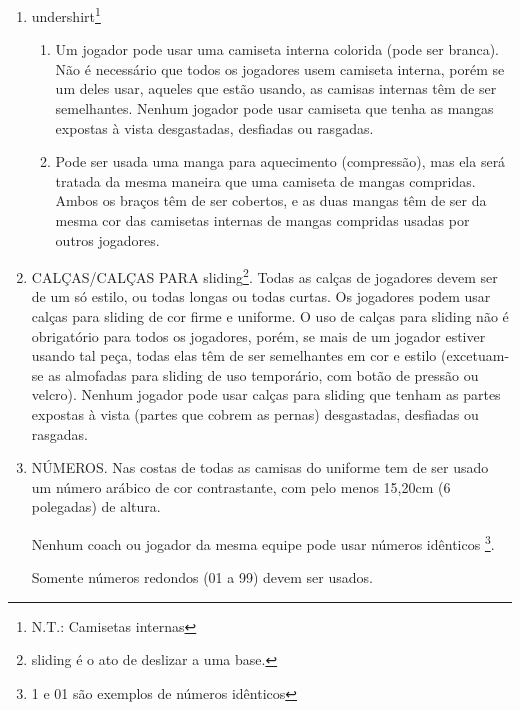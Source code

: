 \begin{multicols}{2}
\begin{enumerate}[label=\alph*)]
\begin{enumerate}[label=\roman* -]
			\item Se um jogador da defensiva usar um capacete aprovado de cor similar \`a do bon\'e do uniforme da equipe, n\~ao ser\'a exigido que ele use um bon\'e. 
		\end{enumerate}
		\item \gls{undershirt}\footnote{N.T.: Camisetas internas} 
		\begin{enumerate}[label=\roman* -]
			\item Um jogador pode usar uma camiseta interna colorida (pode ser branca). N\~ao \'e necess\'ario que todos os jogadores usem camiseta interna, por\'em se um deles usar, aqueles que est\~ao usando, as camisas internas t\^em de ser semelhantes. Nenhum jogador pode usar camiseta que tenha as mangas expostas \`a vista desgastadas, desfiadas ou rasgadas. 
			\item Pode ser usada uma manga para aquecimento (compress\~ao), mas ela ser\'a tratada da mesma maneira que uma camiseta de mangas compridas. Ambos os bra\c{c}os t\^em de ser cobertos, e as duas mangas t\^em de ser da mesma cor das camisetas internas de mangas compridas usadas por outros jogadores. 
		\end{enumerate}
		\item  CAL\c{C}AS/CAL\c{C}AS PARA \gls{sliding}\footnote{\gls{sliding} \'e o ato de deslizar a uma base.}. Todas as cal\c{c}as de jogadores devem ser de um s\'o estilo, ou todas longas ou todas curtas. Os jogadores podem usar cal\c{c}as para \gls{sliding} de cor firme e uniforme. O uso de cal\c{c}as para \gls{sliding} n\~ao \'e obrigat\'orio para todos os jogadores, por\'em, se mais de um jogador estiver usando tal pe\c{c}a, todas elas t\^em de ser semelhantes em cor e estilo (excetuam-se as almofadas para \gls{sliding} de uso tempor\'ario, com bot\~ao de press\~ao ou velcro). Nenhum jogador pode usar cal\c{c}as para \gls{sliding} que tenham as partes expostas \`a vista (partes que cobrem as pernas) desgastadas, desfiadas ou rasgadas. 
		
		\item  NÚMEROS. Nas costas de todas as camisas do uniforme tem de ser usado um n\'umero ar\'abico de cor contrastante, com pelo menos 15,20cm (6 polegadas) de altura. 
		
		Nenhum \gls{coach} ou jogador da mesma equipe pode usar n\'umeros id\^enticos \footnote{1 e 01 s\~ao exemplos de n\'umeros id\^enticos}. 
		
		Somente n\'umeros redondos (01 a 99) devem ser usados. 
		

\end{enumerate}
\end{multicols}
